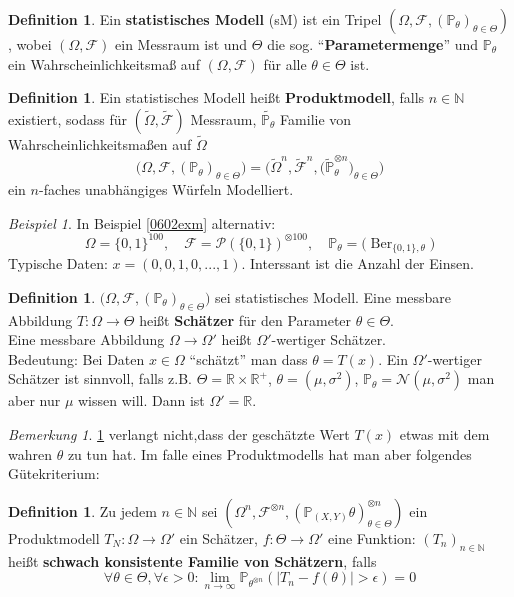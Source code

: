 \documentclass[10pt,a4paper]{article}
\newcommand{\N}{\ensuremath{\mathbb{N}}}
\newcommand{\R}{\ensuremath{\mathbb{R}}}
\newcommand{\abs}[1]{\left|#1\right|}
\newcommand{\Potset}{\mathscr P}
\newcommand{\Prb}{\mathbb P}
\newcommand{\scF}{\ensuremath{\mathscr{F}}}
\newcommand{\Ber}{\operatorname{Ber}}
\newcommand{\Nv}{\mathscr N}
\theoremstyle{plain}
\theoremstyle{definition}
\newtheorem{definition}[theorem]{Definition}
\theoremstyle{remark}
\newtheorem*{bem*}{Bemerkung}
\newtheorem{exm}[theorem]{Beispiel}
\begin{document}
	\begin{definition}
		Ein \textbf{statistisches Modell} (sM) ist ein Tripel $(\Omega,\scF,(\Prb_\theta)_{\theta\in\Theta})$, wobei $(\Omega,\scF)$ ein Messraum ist und $\Theta$ die sog. \enquote{\textbf{Parametermenge}} und $\Prb_\theta$ ein Wahrscheinlichkeitsmaß auf $(\Omega,\scF)$ für alle $\theta\in\Theta$ ist.
	\end{definition}

	\begin{definition}
		Ein statistisches Modell heißt \textbf{Produktmodell}, falls $n\in\N$ existiert, sodass für $(\tilde{\Omega},\tilde{\scF})$ Messraum, $\tilde{\Prb_\theta}$ Familie von Wahrscheinlichkeitsmaßen auf $\tilde\Omega$
		\[\big(\Omega,\scF,(\Prb_\theta)_{\theta\in\Theta}\big)=\big(\tilde{\Omega}^n,\tilde{\scF}^n,\big(\tilde{\Prb}_\theta^{\otimes n}\big)_{\theta\in\Theta}\big)\]
		ein $n$-faches unabhängiges Würfeln Modelliert.
	\end{definition}

	\begin{exm}
		In Beispiel \ref{0602exm} alternativ:
		\[\Omega=\{0,1\}^{100},\quad\scF=\Potset(\{0,1\})^{\otimes 100},\quad\Prb_{\theta}=\big(\Ber_{\{0,1\},\theta}\big)\]
		Typische Daten: $x=(0,0,1,0,...,1)$. Interssant ist die Anzahl der Einsen.
	\end{exm}

	\begin{definition}\label{0607def}
		$\big(\Omega,\scF,(\Prb_\theta)_{\theta\in\Theta}\big)$ sei statistisches Modell. Eine messbare Abbildung $T:\Omega\to\Theta$ heißt \textbf{Schätzer} für den Parameter $\theta\in\Theta$.\\
		Eine messbare Abbildung $\Omega\to\Omega'$ heißt $\Omega'$-wertiger Schätzer.\\
		Bedeutung: Bei Daten $x\in\Omega$ \enquote{schätzt} man dass $\theta=T(x)$. Ein $\Omega'$-wertiger Schätzer ist sinnvoll, falls z.B. $\Theta=\R\times \R^+$, $\theta=(\mu,\sigma^2)$, $\Prb_\theta=\Nv(\mu,\sigma^2)$ man aber nur $\mu$ wissen will. Dann ist $\Omega'=\R$.
	\end{definition}

	\begin{bem*}
		\ref{0607def} verlangt nicht,dass der geschätzte Wert $T(x)$ etwas mit dem wahren $\theta$ zu tun hat. Im falle eines Produktmodells hat man aber folgendes Gütekriterium:
	\end{bem*}

	\begin{definition}\label{0608def}
		Zu jedem $n\in\N$ sei $(\Omega^n,\scF^{\otimes n},\left(\Prb_{(X,Y)}\theta\right)^{\otimes n}_{\theta\in\Theta})$ ein Produktmodell $T_N:\Omega\to\Omega'$ ein Schätzer, $f:\Theta\to\Omega'$ eine Funktion: $(T_n)_{n\in\N}$ heißt \textbf{schwach konsistente Familie von Schätzern}, falls
		\[\forall\theta\in\Theta,\forall\epsilon>0:\lim\limits_{n\to\infty}\Prb_{\theta^{\otimes n}}\left(\abs{T_n-f(\theta)}>\epsilon\right)=0\]
	\end{definition}
\end{document}
